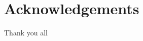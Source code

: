 

\begingroup

\let\clearpage\relax
\let\cleardoublepage\relax
\let\cleardoublepage\relax

\chapter*{Acknowledgements} %

Thank you all

\endgroup
